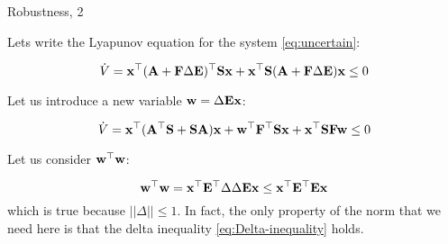 \documentclass{beamer}
\begin{document}
\begin{frame}{Robustness, 2}
	\begin{flushleft}
		
		Lets write the Lyapunov equation for the system \eqref{eq:uncertain}:
		
		\begin{equation}
			\dot V = \mathbf{x}^\top 
			(\mathbf{A} + \mathbf{F} \Delta \mathbf{E})^\top\mathbf{S}\mathbf{x} + \mathbf{x}^\top\mathbf{S} (\mathbf{A} + \mathbf{F} \Delta \mathbf{E}) \mathbf{x} \leq 0
		\end{equation}
		
		Let us introduce a new variable $\mathbf{w} = \Delta \mathbf{E}\mathbf{x}$:
		
		\begin{equation}
			\label{eq:Lyapunov_xw}
			\dot V = \mathbf{x}^\top 
			(\mathbf{A}^\top \mathbf{S} + \mathbf{S}\mathbf{A}) \mathbf{x} + 
			\mathbf{w}^\top \mathbf{F}^\top\mathbf{S} \mathbf{x} +
			\mathbf{x}^\top \mathbf{S}\mathbf{F} \mathbf{w} \leq 0
		\end{equation}
		
		Let us consider $\mathbf{w}^\top \mathbf{w}$:
		
		\begin{equation}
			\label{eq:Delta-inequality}
			\mathbf{w}^\top \mathbf{w} = 
			\mathbf{x}^\top\mathbf{E}^\top \Delta \Delta \mathbf{E}\mathbf{x}
			\leq
			\mathbf{x}^\top\mathbf{E}^\top \mathbf{E}\mathbf{x}
		\end{equation}		
		which is true because $|| \Delta ||\leq 1$. In fact, the only property of the norm that we need here is that the delta inequality \eqref{eq:Delta-inequality} holds.
		
	\end{flushleft}
\end{frame}
\end{document}
